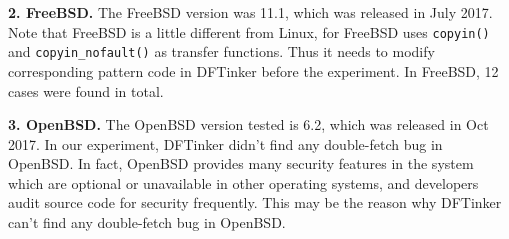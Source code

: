 \documentclass[10pt]{llncs}
\begin{document}



\textbf{2. FreeBSD.}
The FreeBSD version was 11.1, which was released in July 2017. Note that FreeBSD is a little different from Linux, for FreeBSD uses \verb:copyin(): and \verb:copyin_nofault(): as transfer functions. Thus it needs to modify corresponding pattern code in DFTinker before the experiment. In FreeBSD, 12 cases were found in total.



\textbf{3. OpenBSD.}
The OpenBSD version tested is 6.2, which was released in Oct 2017. In our experiment, DFTinker didn't find any double-fetch bug in OpenBSD. In fact, OpenBSD provides many security features in the system which are optional or unavailable in other operating systems, and developers audit source code for security frequently. This may be the reason why DFTinker can't find any double-fetch bug in OpenBSD.
\end{document}
